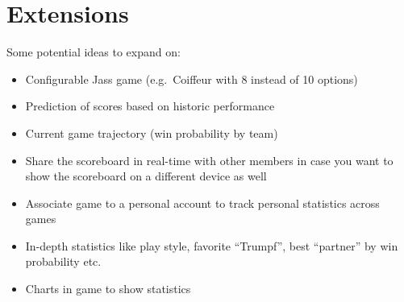 \section*{Extensions}
Some potential ideas to expand on:
\begin{itemize}
    \item Configurable Jass game (e.g.\ Coiffeur with 8 instead of 10 options)
    \item Prediction of scores based on historic performance
    \item Current game trajectory (win probability by team)
    \item Share the scoreboard in real-time with other members in case you want to show the scoreboard on a different device as well
    \item Associate game to a personal account to track personal statistics across games
    \item In-depth statistics like play style, favorite ``Trumpf'', best ``partner'' by win probability etc.
    \item Charts in game to show statistics
\end{itemize}
